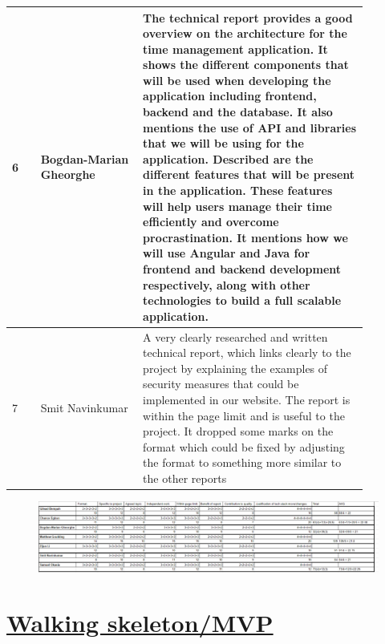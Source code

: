 \documentclass[a4paper]{article}
\begin{document}
{\noindent\begin{tabular}{|p{0.075\linewidth}|p{0.25\linewidth}|p{0.55\linewidth}|} 
\hline
 6 & Bogdan-Marian Gheorghe & The technical report provides a good overview on the architecture for the time management application. It shows the different components that will be used when developing the application including frontend, backend and the database. It also mentions the use of API and libraries that we will be using for the application.  Described are the different features that will be present in the application. These features will help users manage their time efficiently and overcome procrastination.   It mentions how we will use Angular and Java for frontend and backend development respectively, along with other technologies to build a full scalable application. \\
 \hline
 7 & Smit Navinkumar& A very clearly researched and written technical report, which links clearly to the project by explaining the examples of security measures that could be implemented in our website. The report is within the page limit and is useful to the project. It dropped some marks on the format which could be fixed by adjusting the format to something more similar to the other reports\\
 \hline
\end{tabular}}

\begin{figure}[H]
	\centering
	\includegraphics[width=1\textwidth]{./images/Comments.png}
	\label{Fig.Comments}
\end{figure}

\newpage

\section{\href{https://13.40.143.199/}{Walking skeleton/MVP}}
\end{document}

